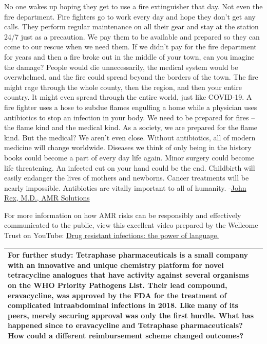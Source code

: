 \documentclass[
  11pt,
  paper=a4,
  ,captions=tableheading
]{scrartcl}
\renewenvironment{quote}{\begin{customblockquote}\list{}{\rightmargin=0em\leftmargin=0em}%
\item\relax\color{blockquote-text}\ignorespaces}{\unskip\unskip\endlist\end{customblockquote}}
\begin{document}
\begin{quote}
No one wakes up hoping they get to use a fire extinguisher that day. Not
even the fire department. Fire fighters go to work every day and hope
they don't get any calls. They perform regular maintenance on all their
gear and stay at the station 24/7 just as a precaution. We pay them to
be available and prepared so they can come to our rescue when we need
them. If we didn't pay for the fire department for years and then a fire
broke out in the middle of your town, can you imagine the damage? People
would die unnecessarily, the medical system would be overwhelmed, and
the fire could spread beyond the borders of the town. The fire might
rage through the whole county, then the region, and then your entire
country. It might even spread through the entire world, just like
COVID-19. A fire fighter uses a hose to subdue flames engulfing a home
while a physician uses antibiotics to stop an infection in your body. We
need to be prepared for fires -- the flame kind and the medical kind. As
a society, we are prepared for the flame kind. But the medical? We
aren't even close. Without antibiotics, all of modern medicine will
change worldwide. Diseases we think of only being in the history books
could become a part of every day life again. Minor surgery could become
life threatening. An infected cut on your hand could be the end.
Childbirth will easily endanger the lives of mothers and newborns.
Cancer treatments will be nearly impossible. Antibiotics are vitally
important to all of humanity.
-\href{https://amr.solutions/fire-extinguishers-of-medicine/}{John Rex,
M.D., AMR Solutions}
\end{quote}

For more information on how AMR risks can be responsibly and effectively
communicated to the public, view this excellent video prepared by the
Wellcome Trust on YouTube:
\href{https://www.youtube.com/watch?v=wTgRpOIxNG0\&t=6s}{Drug resistant
infections: the power of language.}

\begin{longtable}[]{@{}
  >{\raggedright\arraybackslash}p{}@{}}
\toprule
\endhead
\textbf{For further study:} Tetraphase pharmaceuticals is a small
company with an innovative and unique chemistry platform for novel
tetracycline analogues that have activity against several organisms on
the WHO Priority Pathogens List. Their lead compound, eravacycline, was
approved by the FDA for the treatment of complicated intraabdominal
infections in 2018. Like many of its peers, merely securing approval was
only the first hurdle. What has happened since to eravacycline and
Tetraphase pharmaceuticals? How could a different reimbursement scheme
changed outcomes? \\
\bottomrule
\end{longtable}
\end{document}
